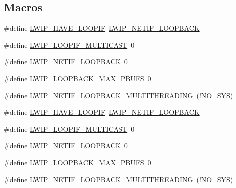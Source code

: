 \subsection*{Macros}
\begin{DoxyCompactItemize}
\item 
\#define \hyperlink{group__lwip__opts__loop_gaa2b1f736373cd896e212644aa453fbaf}{L\+W\+I\+P\+\_\+\+H\+A\+V\+E\+\_\+\+L\+O\+O\+P\+IF}~\hyperlink{group__lwip__opts__loop_ga724a0ea765d5a47d026d529725f31c01}{L\+W\+I\+P\+\_\+\+N\+E\+T\+I\+F\+\_\+\+L\+O\+O\+P\+B\+A\+CK}
\item 
\#define \hyperlink{group__lwip__opts__loop_ga10a878b390c2fbe421d82502001c7300}{L\+W\+I\+P\+\_\+\+L\+O\+O\+P\+I\+F\+\_\+\+M\+U\+L\+T\+I\+C\+A\+ST}~0
\item 
\#define \hyperlink{group__lwip__opts__loop_ga724a0ea765d5a47d026d529725f31c01}{L\+W\+I\+P\+\_\+\+N\+E\+T\+I\+F\+\_\+\+L\+O\+O\+P\+B\+A\+CK}~0
\item 
\#define \hyperlink{group__lwip__opts__loop_gaacc3ad5d0a771d45fb0a3e3a09b1dbea}{L\+W\+I\+P\+\_\+\+L\+O\+O\+P\+B\+A\+C\+K\+\_\+\+M\+A\+X\+\_\+\+P\+B\+U\+FS}~0
\item 
\#define \hyperlink{group__lwip__opts__loop_gaa28d13ddd5281b1912276991e7ea58c5}{L\+W\+I\+P\+\_\+\+N\+E\+T\+I\+F\+\_\+\+L\+O\+O\+P\+B\+A\+C\+K\+\_\+\+M\+U\+L\+T\+I\+T\+H\+R\+E\+A\+D\+I\+NG}~(!\hyperlink{openmote-cc2538_2lwip_2test_2unit_2lwipopts_8h_ae00ba99de94a5bf84d832be8976df59b}{N\+O\+\_\+\+S\+YS})
\item 
\#define \hyperlink{group__lwip__opts__loop_gaa2b1f736373cd896e212644aa453fbaf}{L\+W\+I\+P\+\_\+\+H\+A\+V\+E\+\_\+\+L\+O\+O\+P\+IF}~\hyperlink{group__lwip__opts__loop_ga724a0ea765d5a47d026d529725f31c01}{L\+W\+I\+P\+\_\+\+N\+E\+T\+I\+F\+\_\+\+L\+O\+O\+P\+B\+A\+CK}
\item 
\#define \hyperlink{group__lwip__opts__loop_ga10a878b390c2fbe421d82502001c7300}{L\+W\+I\+P\+\_\+\+L\+O\+O\+P\+I\+F\+\_\+\+M\+U\+L\+T\+I\+C\+A\+ST}~0
\item 
\#define \hyperlink{group__lwip__opts__loop_ga724a0ea765d5a47d026d529725f31c01}{L\+W\+I\+P\+\_\+\+N\+E\+T\+I\+F\+\_\+\+L\+O\+O\+P\+B\+A\+CK}~0
\item 
\#define \hyperlink{group__lwip__opts__loop_gaacc3ad5d0a771d45fb0a3e3a09b1dbea}{L\+W\+I\+P\+\_\+\+L\+O\+O\+P\+B\+A\+C\+K\+\_\+\+M\+A\+X\+\_\+\+P\+B\+U\+FS}~0
\item 
\#define \hyperlink{group__lwip__opts__loop_gaa28d13ddd5281b1912276991e7ea58c5}{L\+W\+I\+P\+\_\+\+N\+E\+T\+I\+F\+\_\+\+L\+O\+O\+P\+B\+A\+C\+K\+\_\+\+M\+U\+L\+T\+I\+T\+H\+R\+E\+A\+D\+I\+NG}~(!\hyperlink{openmote-cc2538_2lwip_2test_2unit_2lwipopts_8h_ae00ba99de94a5bf84d832be8976df59b}{N\+O\+\_\+\+S\+YS})
\end{DoxyCompactItemize}


